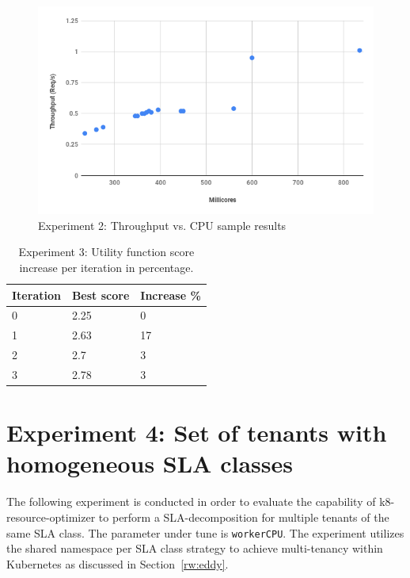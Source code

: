 \begin{figure}[H]
    \centering
    \includegraphics[width=1\textwidth]{chapter-evaluation/exp2-results-2.png}
    \caption{Experiment 2: Throughput vs. CPU sample results   }
    \label{fig:exp2-results}
\end{figure}

\begin{table}[H]
\caption{Experiment 3: Utility function score increase per iteration in percentage.}
\label{tbl:exp2-increase}
\centering
\begin{tabular}{|l|l|l|}
\hline
\textbf{Iteration} & \textbf{Best score} & \textbf{Increase \%} \\ \hline
0                  & 2.25                & 0                    \\ \hline
1                  & 2.63                & 17                   \\ \hline
2                  & 2.7                 & 3                    \\ \hline
3                  & 2.78                & 3                    \\ \hline
\end{tabular}
\end{table}





\newpage
\section{Experiment 4: Set of tenants with homogeneous SLA classes}
The following  experiment is conducted in order to evaluate the capability of k8-resource-optimizer to perform a SLA-decomposition for multiple tenants of the same SLA class. The parameter under tune is \texttt{workerCPU}.  The experiment utilizes the shared namespace per SLA class strategy to achieve multi-tenancy within Kubernetes as discussed in Section~\ref{rw:eddy}. 

